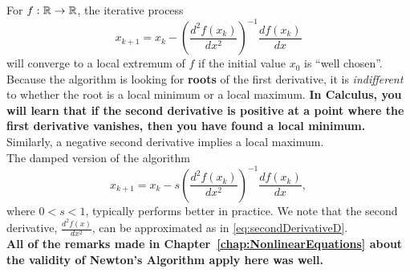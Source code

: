 \begin{tcolorbox}[sharp corners, colback=green!30, colframe=green!80!blue,title=\textbf{\Large Optimization as a Form of Root Finding: Scalar Decision Variable }]

For $f:\mathbb R \to \mathbb R$, the iterative process
\begin{equation}
    \label{eq:NewtonMethod02Optimization}
x_{k+1}=x_{k} - \left(   \frac{d^2f(x_k)}{dx^2}\right)^{-1} \frac{ df(x_k)}{dx}
\end{equation}
will converge to a local extremum of $f$ if the initial value $x_0$ is ``well chosen''. Because the algorithm is looking for \textbf{roots} of the first derivative, it is \textit{indifferent} to whether the root is a local minimum or a local maximum. \textbf{In Calculus, you will learn that if the second derivative is positive at a point where the first derivative vanishes, then you have found a local minimum.} Similarly, a negative second derivative implies a local maximum. \\

The damped version of the algorithm 
\begin{equation}
    \label{eq:NewtonMethodDampedOptimization}
x_{k+1}=x_{k} - s \left(   \frac{d^2f(x_k)}{dx^2}\right)^{-1} \frac{ df(x_k)}{dx},
\end{equation}
where $0< s < 1$, typically performs better in practice. We note that the second derivative, $\frac{d^2f(x)}{dx^2}$, can be approximated as in \eqref{eq:secondDerivativeD}.\\

\textbf{All of the remarks made in Chapter~\ref{chap:NonlinearEquations} about the validity of Newton's Algorithm apply here was well.}
\end{tcolorbox}

